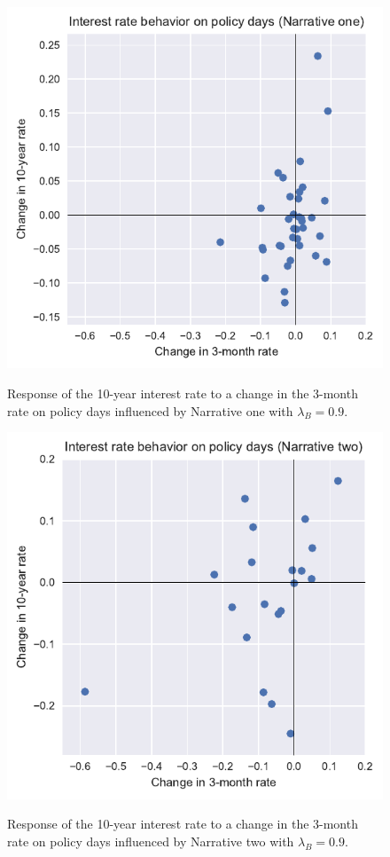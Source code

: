 \documentclass[11pt,a4paper,english,oneside]{book}
\numberwithin{equation}{chapter}
\begin{document}
\begin{figure}
	\caption{Response of the 10-year interest rate to a change in the 3-month rate on policy days influenced by Narrative one with $\lambda_B=0.9$.}
	\centering
	\includegraphics[scale=1]{Images/ChangePlot02_L0_9.pdf}
	\label{Change02_L09}
\end{figure}

\begin{figure}
	\caption{Response of the 10-year interest rate to a change in the 3-month rate on policy days influenced by Narrative two with $\lambda_B=0.9$.}
	\centering
	\includegraphics[scale=1]{Images/ChangePlot03_L0_9.pdf}
	\label{Change03_L09}
\end{figure}
\end{document}
